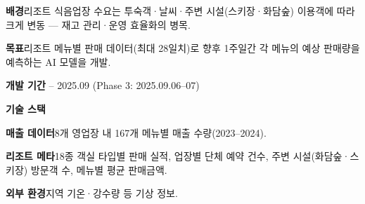 \setlength{\stepgap}{0.05mm}
\setlength{\substepsep}{0.02mm}


\vspace{-2.4mm}%

\begin{cvitems}
  \item {\textbf{배경}\enskip 리조트 식음업장 수요는 투숙객·날씨·주변 시설(스키장·화담숲) 이용객에 따라 크게 변동 --- 재고 관리·운영 효율화의 병목.}
  \item {\textbf{목표}\enskip 리조트 메뉴별 판매 데이터(최대 28일치)로 향후 1주일간 각 메뉴의 예상 판매량을 예측하는 AI 모델을 개발.}
  \item {\textbf{개발 기간} -- 2025.09 (Phase 3: 2025.09.06--07)}
  \item {\textbf{기술 스택}\enskip {}     }
\end{cvitems}
\vspace{-0.6mm}

\begin{cvitems}
  \item {\textbf{매출 데이터}\enskip 8개 영업장 내 167개 메뉴별 매출 수량(2023--2024).}
  \item {\textbf{리조트 메타}\enskip 18종 객실 타입별 판매 실적, 업장별 단체 예약 건수, 주변 시설(화담숲·스키장) 방문객 수, 메뉴별 평균 판매금액.}
  \item {\textbf{외부 환경}\enskip 지역 기온·강수량 등 기상 정보.}
\end{cvitems}
\vspace{-0.6mm}



